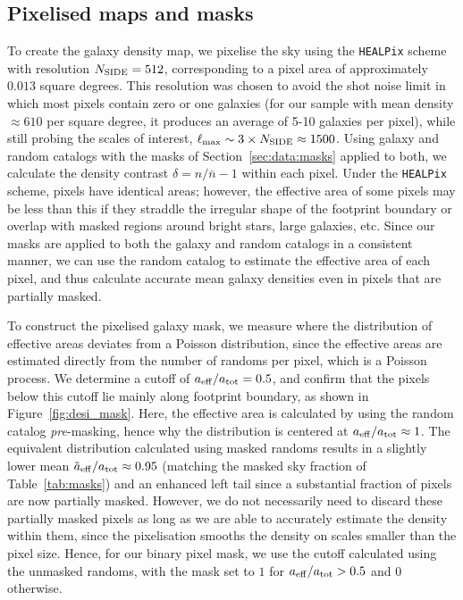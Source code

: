 \subsection{Pixelised maps and masks}

To create the galaxy density map, we pixelise the sky using the \texttt{HEALPix} scheme with resolution $N_{\rm SIDE} = 512$, corresponding to a pixel area of approximately $0.013$ square degrees. This resolution was chosen to avoid the shot noise limit in which most pixels contain zero or one galaxies (for our sample with mean density $\approx 610$ per square degree, it produces an average of 5-10 galaxies per pixel), while still probing the scales of interest, $\ell_{\rm max} \sim 3 \times N_{\rm SIDE} \approx 1500$. Using galaxy and random catalogs with the masks of Section~\ref{sec:data:masks} applied to both, we calculate the density contrast $\delta = n/\bar{n} - 1$ within each pixel. Under the \texttt{HEALPix} scheme, pixels have identical areas; however, the effective area of some pixels may be less than this if they straddle the irregular shape of the footprint boundary or overlap with masked regions around bright stars, large galaxies, etc. Since our masks are applied to both the galaxy and random catalogs in a consistent manner, we can use the random catalog to estimate the effective area of each pixel, and thus calculate accurate mean galaxy densities even in pixels that are partially masked.

To construct the pixelised galaxy mask, we measure where the distribution of effective areas deviates from a Poisson distribution, since the effective areas are estimated directly from the number of randoms per pixel, which is a Poisson process. We determine a cutoff of $a_{\rm eff}/a_{\rm tot} = 0.5$, and confirm that the pixels below this cutoff lie mainly along footprint boundary, as shown in Figure~\ref{fig:desi_mask}. Here, the effective area is calculated by using the random catalog \textit{pre}-masking, hence why the distribution is centered at $a_{\rm eff}/a_{\rm tot} \approx 1$. The equivalent distribution calculated using masked randoms results in a slightly lower mean $\tilde{a}_{\rm eff}/a_{\rm tot} \approx 0.95$ (matching the masked sky fraction of Table~\ref{tab:masks}) and an enhanced left tail since a substantial fraction of pixels are now partially masked. However, we do not necessarily need to discard these partially masked pixels as long as we are able to accurately estimate the density within them, since the pixelisation smooths the density on scales smaller than the pixel size. Hence, for our binary pixel mask, we use the cutoff calculated using the unmasked randoms, with the mask set to $1$ for $a_{\rm eff}/a_{\rm tot} > 0.5$ and 0 otherwise.


